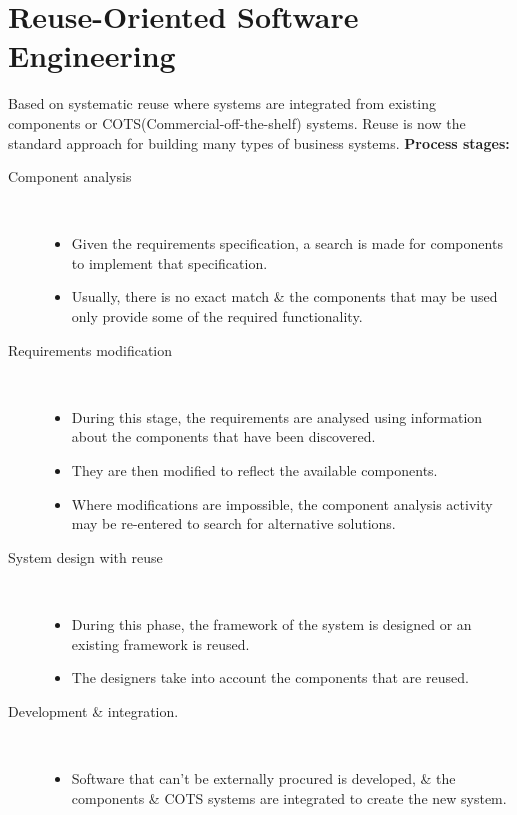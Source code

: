 \documentclass{report}
\begin{document}
\section{Reuse-Oriented Software Engineering}
\noindent Based on systematic reuse where systems are integrated from existing components or COTS(Commercial-off-the-shelf) systems. Reuse is now the standard approach for building many types of business systems.\newline
\textbf{Process stages:}
\begin{description}
  \item [Component analysis] \
  \begin{itemize}
    \item Given the requirements specification, a search is made for components to implement that specification.
    \item Usually, there is no exact match \& the components that may be used only provide some of the required functionality.
  \end{itemize}
  \item[Requirements modification] \
  \begin{itemize}
  \item During this stage, the requirements are analysed using information about the components that have been discovered.
  \item They are then modified to reflect the available components.
  \item Where modifications are impossible, the component analysis activity may be re-entered to search for alternative solutions.
  \end{itemize}
  \item [System design with reuse] \
  \begin{itemize}
  \item During this phase, the framework of the system is designed or an existing framework is reused.
  \item The designers take into account the components that are reused.
  \end{itemize}
  \item [Development \& integration.] \
  \begin{itemize}
   \item Software that can’t be externally procured is developed, \& the components \& COTS systems are integrated to create the new system.
  \end{itemize}
\end{description}
\end{document}
